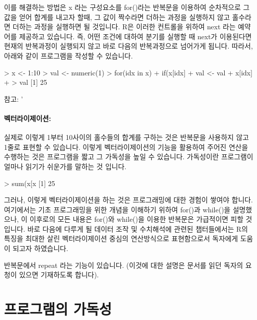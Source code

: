 이를 해결하는 방법은 x 라는 구성요소를 for()라는 반복문을 이용하여 순차적으로 그 값을 얻어 합계를 내고자 할때, 그 값이 짝수라면 더하는 과정을 실행하지 않고 홀수라면 더하는 과정을 실행하면 될 것입니다.
R은 이러한 컨트롤을 위하여 next 라는 예약어를 제공하고 있습니다.
즉, 어떤 조건에 대하여 분기를 실행할 때 next가 이용된다면 현재의 반복과정이 실행되지 않고 바로 다음의 반복과정으로 넘어가게 됩니다. 
따라서, 아래와 같이 프로그램을 작성할 수 있습니다. 


\begin{Schunk}
\begin{Soutput}
> x <- 1:10
> val <- numeric(1)
> for(idx in x){
+ if(x[idx] %% 2 == 0) next
+ val <- val + x[idx]
+ }
> val
[1] 25

참고: '%%'는 나머지를 구하는 연산자임을 기억하시기 바랍니다.

\end{Soutput}
\end{Schunk}


\paragraph{벡터라이제이션: }

실제로 이렇게 1부터 10사이의 홀수들의 합계를 구하는 것은 반복문을 사용하지 않고 1줄로 표현할 수 있습니다.
이렇게 벡터라이제이션의 기능을 활용하여 주어진 연산을 수행하는 것은 프로그램을 짧고 그 가독성을 높일 수 있습니다. 
가독성이란 프로그램이 얼마나 읽기가 쉬운가를 말하는 것 입니다.

\begin{Schunk}
\begin{Soutput}
> sum(x[x %% 2 != 0])
[1] 25
\end{Soutput}
\end{Schunk}

그러나, 이렇게 벡터라이제이션을 하는 것은 프로그래밍에 대한 경험이 쌓여야 합니다. 
여기에서는 기초 프로그래밍을 위한 개념을 이해하기 위하여 for()과 while()을 설명했으나, 이 이후로의 모든 내용은 for()와 while()을 이용한 반복문은 가급적이면 피할 것입니다.
바로 다음에 다루게 될 데이터 조작 및 수치해석에 관련된 챕터들에서는 R의 특징을 최대한 살린 벡터라이제이션 중심의 연산방식으로 표현함으로서 독자에게 도움이 되고자 하였습니다.

반복문에서 repeat 라는 기능이 있습니다. (이것에 대한 설명은 문서를 읽던 독자의 요청이 있으면 기재하도록 합니다).

\section{프로그램의 가독성}

